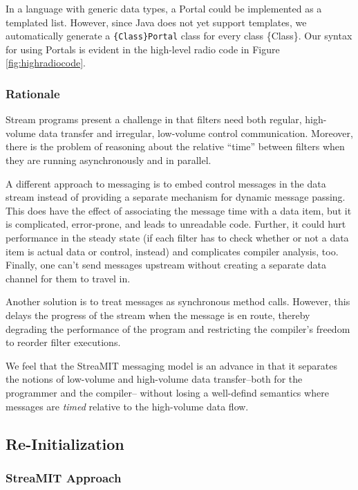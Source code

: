 In a language with generic data types, a Portal could be implemented
as a templated list.  However, since Java does not yet support
templates, we automatically generate a {\tt \{Class\}Portal} class for
every class \{Class\}.  Our syntax for using Portals is evident in the
high-level radio code in Figure \ref{fig:highradiocode}.

\subsubsection{Rationale}

Stream programs present a challenge in that filters need both regular,
high-volume data transfer and irregular, low-volume control
communication.  Moreover, there is the problem of reasoning about the
relative ``time'' between filters when they are running asynchronously
and in parallel.

A different approach to messaging is to embed control messages in the
data stream instead of providing a separate mechanism for dynamic
message passing.  This does have the effect of associating the message
time with a data item, but it is complicated, error-prone, and leads
to unreadable code.  Further, it could hurt performance in the steady
state (if each filter has to check whether or not a data item is
actual data or control, instead) and complicates compiler analysis,
too.  Finally, one can't send messages upstream without creating a
separate data channel for them to travel in.

Another solution is to treat messages as synchronous method calls.
However, this delays the progress of the stream when the message is en
route, thereby degrading the performance of the program and
restricting the compiler's freedom to reorder filter executions.  

We feel that the StreaMIT messaging model is an advance in that it
separates the notions of low-volume and high-volume data
transfer--both for the programmer and the compiler-- without losing a
well-defind semantics where messages are {\it timed} relative to the
high-volume data flow.

\subsection{Re-Initialization}

\subsubsection{StreaMIT Approach}

